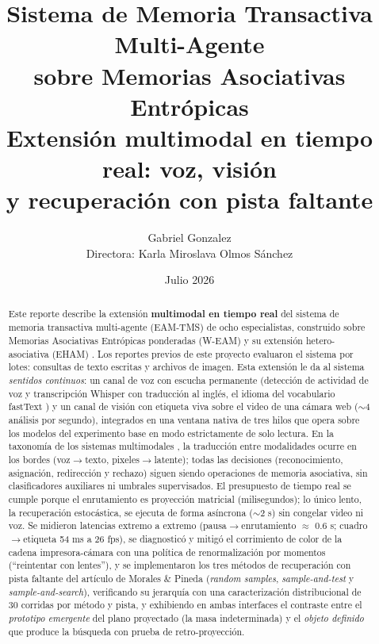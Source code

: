 \documentclass[11pt]{article}
\title{%
    \textbf{Sistema de Memoria Transactiva Multi-Agente}\\
    \textbf{sobre Memorias Asociativas Entrópicas}\\[0.3em]
    \large Extensión multimodal en tiempo real: voz, visión\\
    y recuperación con pista faltante\\[0.5em]
}
\author{Gabriel Gonzalez\\[0.4em]\small Directora: Karla Miroslava Olmos Sánchez}
\date{Julio 2026}
\begin{document}
\maketitle

\begin{abstract}
Este reporte describe la extensión \textbf{multimodal en tiempo real} del sistema de
memoria transactiva multi-agente (EAM-TMS) de ocho especialistas, construido sobre
Memorias Asociativas Entrópicas ponderadas (W-EAM)
\cite{pineda2021entropic,pineda2022weighted} y su extensión hetero-asociativa (EHAM)
\cite{morales2024hetero,morales2025missing}.
Los reportes previos de este proyecto evaluaron el sistema por lotes: consultas de
texto escritas y archivos de imagen.
Esta extensión le da al sistema \emph{sentidos continuos}: un canal de voz con escucha
permanente (detección de actividad de voz y transcripción Whisper
\cite{radford2023whisper} con traducción al inglés, el idioma del vocabulario
fastText \cite{bojanowski2017fasttext}) y un canal de visión con etiqueta viva sobre el
video de una cámara web ($\sim$4 análisis por segundo), integrados en una ventana
nativa de tres hilos que opera sobre los modelos del experimento base en modo
estrictamente de solo lectura.
En la taxonomía de los sistemas multimodales \cite{baltrusaitis2019multimodal}, la
traducción entre modalidades ocurre en los bordes (voz$\to$texto, pixeles$\to$latente);
todas las decisiones (reconocimiento, asignación, redirección y rechazo) siguen siendo
operaciones de memoria asociativa, sin clasificadores auxiliares ni umbrales
supervisados.
El presupuesto de tiempo real se cumple porque el enrutamiento es proyección matricial
(milisegundos); lo único lento, la recuperación estocástica, se ejecuta de forma
asíncrona ($\sim$2 s) sin congelar video ni voz.
Se midieron latencias extremo a extremo (pausa$\to$enrutamiento $\approx$ 0.6 s;
cuadro$\to$etiqueta 54 ms a 26 fps), se diagnosticó y mitigó el corrimiento de color de
la cadena impresora-cámara con una política de renormalización por momentos
(``reintentar con lentes''), y se implementaron los tres métodos de recuperación con
pista faltante del artículo de Morales \& Pineda \cite{morales2025missing}
(\emph{random samples}, \emph{sample-and-test} y \emph{sample-and-search}),
verificando su jerarquía con una caracterización distribucional de 30 corridas por
método y pista, y exhibiendo en ambas interfaces el contraste
entre el \emph{prototipo emergente} del plano proyectado (la masa indeterminada) y el
\emph{objeto definido} que produce la búsqueda con prueba de retro-proyección.
\end{abstract}

\tableofcontents
\newpage











\end{document}
